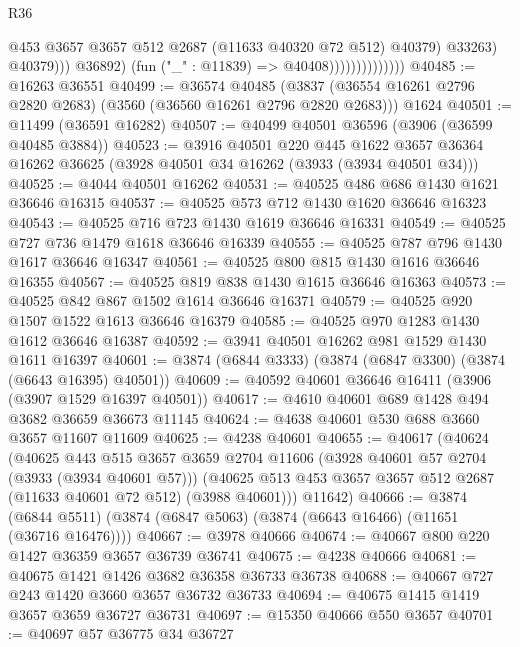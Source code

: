 \begin{lexlean}{R36}
\begin{coremodule}
                                          @453
                                          @3657
                                          @3657
                                          @512
                                          @2687
                                          (@11633 @40320 @72 @512)
                                          @40379)
                                        @33263)
                                      @40379)))
                                @36892)
                              (fun ("_" : @11839) => @40408))))))))))))))
@40485 := @16263 @36551
@40499 := @36574
    @40485
    (@3837 (@36554 @16261 @2796 @2820 @2683) (@3560 (@36560 @16261 @2796 @2820 @2683)))
    @1624
@40501 := @11499 (@36591 @16282)
@40507 := @40499 @40501 @36596 (@3906 (@36599 @40485 @3884))
@40523 := @3916
    @40501
    @220
    @445
    @1622
    @3657
    @36364
    @16262
    @36625
    (@3928 @40501 @34 @16262 (@3933 (@3934 @40501 @34)))
@40525 := @4044 @40501 @16262
@40531 := @40525 @486 @686 @1430 @1621 @36646 @16315
@40537 := @40525 @573 @712 @1430 @1620 @36646 @16323
@40543 := @40525 @716 @723 @1430 @1619 @36646 @16331
@40549 := @40525 @727 @736 @1479 @1618 @36646 @16339
@40555 := @40525 @787 @796 @1430 @1617 @36646 @16347
@40561 := @40525 @800 @815 @1430 @1616 @36646 @16355
@40567 := @40525 @819 @838 @1430 @1615 @36646 @16363
@40573 := @40525 @842 @867 @1502 @1614 @36646 @16371
@40579 := @40525 @920 @1507 @1522 @1613 @36646 @16379
@40585 := @40525 @970 @1283 @1430 @1612 @36646 @16387
@40592 := @3941 @40501 @16262 @981 @1529 @1430 @1611 @16397
@40601 := @3874 (@6844 @3333) (@3874 (@6847 @3300) (@3874 (@6643 @16395) @40501))
@40609 := @40592 @40601 @36646 @16411 (@3906 (@3907 @1529 @16397 @40501))
@40617 := @4610 @40601 @689 @1428 @494 @3682 @36659 @36673 @11145
@40624 := @4638 @40601 @530 @688 @3660 @3657 @11607 @11609
@40625 := @4238 @40601
@40655 := @40617
    (@40624
      (@40625
        @443
        @515
        @3657
        @3659
        @2704
        @11606
        (@3928 @40601 @57 @2704 (@3933 (@3934 @40601 @57)))
        (@40625 @513 @453 @3657 @3657 @512 @2687 (@11633 @40601 @72 @512) (@3988 @40601)))
      @11642)
@40666 := @3874 (@6844 @5511) (@3874 (@6847 @5063) (@3874 (@6643 @16466) (@11651 (@36716 @16476))))
@40667 := @3978 @40666
@40674 := @40667 @800 @220 @1427 @36359 @3657 @36739 @36741
@40675 := @4238 @40666
@40681 := @40675 @1421 @1426 @3682 @36358 @36733 @36738
@40688 := @40667 @727 @243 @1420 @3660 @3657 @36732 @36733
@40694 := @40675 @1415 @1419 @3657 @3659 @36727 @36731
@40697 := @15350 @40666 @550 @3657
@40701 := @40697 @57 @36775 @34 @36727

\end{coremodule}
\end{lexlean}
